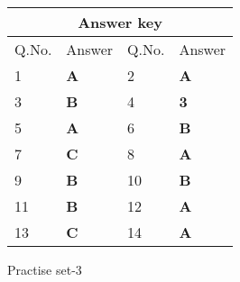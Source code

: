 \setlength\arrayrulewidth{1pt}
\begin{table}[H]
	\centering
	\begin{tabular}{|p{1.5cm}|p{1.5cm}||p{1.5cm}|p{1.5cm}|}
		\hline
		\multicolumn{4}{|c|}{\textbf{Answer key}}\\\hline\hline
		\rowcolor{ocrel}Q.No.&Answer&Q.No.&Answer\\\hline
		1&\textbf{A} &2&\textbf{A}\\\hline 
		3&\textbf{B} &4&\textbf{3} \\\hline
		5&\textbf{A} &6&\textbf{B} \\\hline
		7&\textbf{C}&8&\textbf{A}\\\hline
		9&\textbf{B}&10&\textbf{B}\\\hline
		11&\textbf{B} &12&\textbf{A}\\\hline
		13&\textbf{C}&14&\textbf{A}\\\hline
	\end{tabular}
\end{table}
\newpage
\begin{abox}
	Practise set-3
\end{abox}
